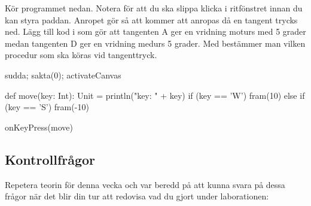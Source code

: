 \Subtask \label{subtask:keypress}  Kör programmet nedan. Notera  för att du ska slippa klicka i ritfönstret innan du kan styra paddan. Anropet  gör så att  kommer att anropas då en tangent trycks ned. Lägg till kod i  som gör att tangenten A ger en vridning moturs med 5 grader medan tangenten D ger en vridning medurs 5 grader. Med  bestämmer man vilken procedur som ska köras vid tangenttryck.

\begin{Code}
sudda; sakta(0); activateCanvas

def move(key: Int): Unit = {
  println("key: " + key)
  if (key == 'W') fram(10)
  else if (key == 'S') fram(-10)
}

onKeyPress(move)
\end{Code}





\subsection{Kontrollfrågor}\Checkpoint

\noindent Repetera teorin för denna vecka och var beredd på att kunna svara på dessa frågor när det blir din tur att redovisa vad du gjort under laborationen:

